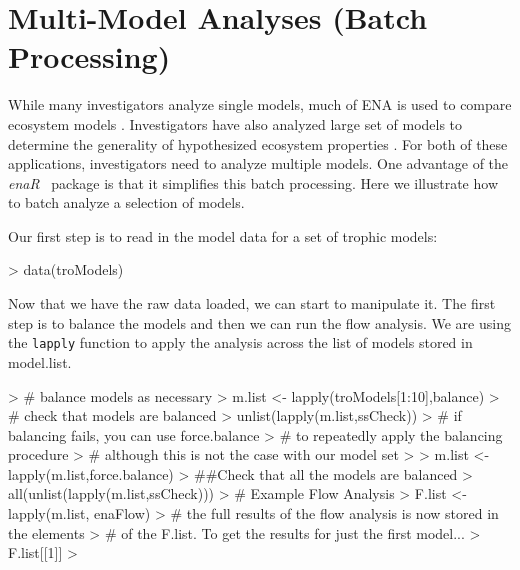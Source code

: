 \documentclass[article]{jss}
\begin{document}
\section{Multi-Model Analyses (Batch Processing)}

While many investigators analyze single models, much of ENA is used to
compare ecosystem models \cite[e.g.,][]{baird91, baird95, christian03,
  whipple07}.  Investigators have also analyzed large set of models to
determine the generality of hypothesized ecosystem properties
\citep[e.g.,][]{christensen95, borrett10_hmg, salas11_did}.  For both
of these applications, investigators need to analyze multiple models.
One advantage of the \textit{enaR} \R\ package is that it simplifies this
batch processing.  Here we illustrate how to batch analyze a
selection of models.

Our first step is to read in the model data for a set of trophic
models:

\begin{Schunk}
\begin{Sinput}
> data(troModels)
\end{Sinput}
\end{Schunk}


Now that we have the raw data loaded, we can start to manipulate
it.  The first step is to balance the models and then we can run the
flow analysis.  We are using the \texttt{lapply} function to apply the
analysis across the list of models stored in model.list.


\begin{Schunk}
\begin{Sinput}
> # balance models as necessary
> m.list <- lapply(troModels[1:10],balance)
> # check that models are balanced
> unlist(lapply(m.list,ssCheck))
> # if balancing fails, you can use force.balance
> # to repeatedly apply the balancing procedure
> # although this is not the case with our model set
> 
> m.list <- lapply(m.list,force.balance)
> ##Check that all the models are balanced
> all(unlist(lapply(m.list,ssCheck)))
> # Example Flow Analysis
> F.list <- lapply(m.list, enaFlow)
> # the full results of the flow analysis is now stored in the elements
> # of the F.list.  To get the results for just the first model...
> F.list[[1]]
> 
\end{Sinput}
\end{Schunk}
\end{document}
